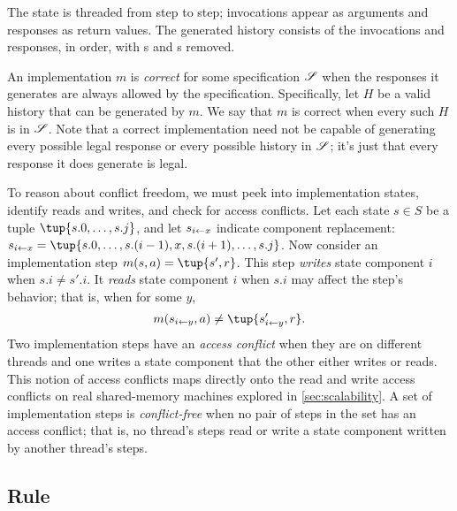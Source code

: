 \noindent The state is threaded from step to step;
invocations appear as arguments and responses as
return values. The generated history consists of the invocations
and responses, in order, with \YIELD{}s and \CONTINUE{}s removed.

An implementation $m$ is \emph{correct} for some specification $\mathscr{S}$
when the responses it generates are always allowed by the specification.
Specifically, let $H$ be a valid history that can be generated by $m$.
We say that $m$ is correct when every such $H$ is in $\mathscr{S}$.
Note that a correct implementation need not be
capable of generating
every possible legal response or every possible history in $\mathscr{S}$;
it's just that every response it does
generate is legal.

To reason about conflict freedom, we must peek into
implementation states, identify reads and writes, and check for access
conflicts.
%
Let each state $s \in S$ be a tuple $\tup{s.0, \dots, s.j}$, and let
%
$s_{i\gets x}$ indicate component
replacement: $\tupleadj{s}{i}{x} = \tup{s.0,\dots,s.(i-1),x,s.(i+1),\dots,s.j}$.
%
Now consider an implementation step $m(s,a) = \tup{s', r}$.
%
This step \emph{writes} state component $i$
when $s.i \neq s'.i$.
%
It \emph{reads} state component $i$ when $s.i$ may affect the
step's behavior; that is, when for some $y$,
%
\[m(\tupleadj{s}{i}{y},a) \neq \tup{\tupleadj{s'}{i}{y}, r}.\]
%
Two implementation steps have an \emph{access conflict} when they are on
different threads and one writes a state component that the other either
writes or reads.
%
This notion of access conflicts maps directly onto the read and write access
conflicts on real shared-memory machines explored in
\cref{sec:scalability}.
%
A set of implementation steps is \emph{conflict-free}
when no pair of steps in the set has an access conflict; that is, no
thread's steps read or write a state component written by another
thread's steps.


\subsection{Rule}

